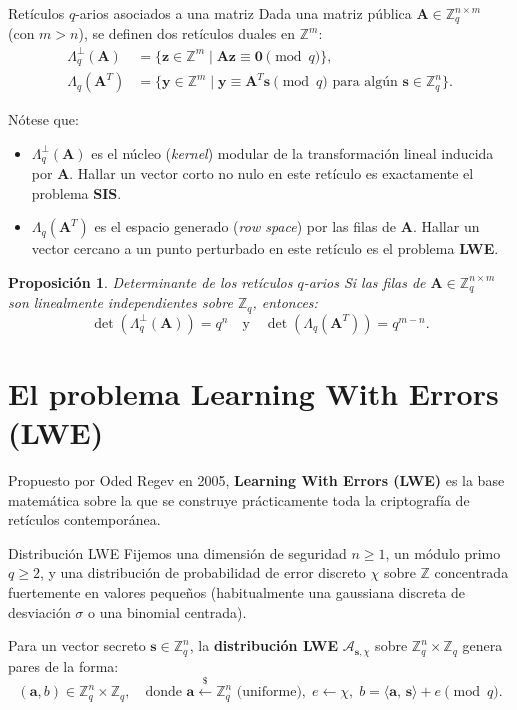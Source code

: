 \documentclass[11pt,a4paper,twoside,openright]{book}
\theoremstyle{plain}
\newtheorem{prop}[thm]{Proposici\'{o}n}
\theoremstyle{definition}
\theoremstyle{remark}
\newcommand{\Z}{\mathbb{Z}}
\newcommand{\Zq}{\mathbb{Z}_q}
\newcommand{\vv}[1]{\mathbf{#1}}
\newcommand{\mm}[1]{\mathbf{#1}}
\newcommand{\inner}[2]{\langle #1,\, #2 \rangle}
\begin{document}
\begin{midef}{Ret\'iculos $q$-arios asociados a una matriz}
Dada una matriz p\'ublica $\mm{A} \in \Zq^{n \times m}$ (con $m > n$), se definen dos ret\'iculos duales en $\Z^m$:
\begin{align}
  \Lambda_q^\perp(\mm{A}) &= \{ \vv{z} \in \Z^m \mid \mm{A}\vv{z} \equiv \vv{0} \pmod q \}, \\
  \Lambda_q(\mm{A}^T) &= \{ \vv{y} \in \Z^m \mid \vv{y} \equiv \mm{A}^T \vv{s} \pmod q \text{ para alg\'un } \vv{s} \in \Zq^n \}.
\end{align}
\end{midef}

N\'otese que:
\begin{itemize}
  \item $\Lambda_q^\perp(\mm{A})$ es el n\'ucleo (\emph{kernel}) modular de la transformaci\'on lineal inducida por $\mm{A}$. Hallar un vector corto no nulo en este ret\'iculo es exactamente el problema \textbf{SIS}.
  \item $\Lambda_q(\mm{A}^T)$ es el espacio generado (\emph{row space}) por las filas de $\mm{A}$. Hallar un vector cercano a un punto perturbado en este ret\'iculo es el problema \textbf{LWE}.
\end{itemize}

\begin{prop}{Determinante de los ret\'iculos $q$-arios}
Si las filas de $\mm{A} \in \Zq^{n \times m}$ son linealmente independientes sobre $\Zq$, entonces:
\[
  \det(\Lambda_q^\perp(\mm{A})) = q^n \quad \text{y} \quad \det(\Lambda_q(\mm{A}^T)) = q^{m-n}.
\]
\end{prop}

\section{El problema Learning With Errors (LWE)}

Propuesto por Oded Regev en 2005, \textbf{Learning With Errors (LWE)} es la base matem\'atica sobre la que se construye pr\'acticamente toda la criptograf\'ia de ret\'iculos contempor\'anea.

\begin{midef}{Distribuci\'on LWE}
Fijemos una dimensi\'on de seguridad $n \geq 1$, un m\'odulo primo $q \geq 2$, y una distribuci\'on de probabilidad de error discreto $\chi$ sobre $\Z$ concentrada fuertemente en valores peque\~nos (habitualmente una gaussiana discreta de desviaci\'on $\sigma$ o una binomial centrada).

Para un vector secreto $\vv{s} \in \Zq^n$, la \textbf{distribuci\'on LWE} $\mathcal{A}_{\vv{s}, \chi}$ sobre $\Zq^n \times \Zq$ genera pares de la forma:
\[
  (\vv{a}, b) \in \Zq^n \times \Zq, \quad \text{donde } \vv{a} \xleftarrow{\$} \Zq^n \text{ (uniforme)}, \; e \leftarrow \chi, \; b = \inner{\vv{a}}{\vv{s}} + e \pmod q.
\]
\end{midef}
\end{document}
